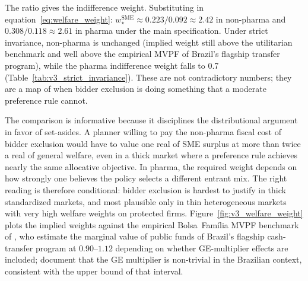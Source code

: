 The ratio gives the indifference weight. Substituting in equation~\eqref{eq:welfare_weight}: $w^{\text{SME}}_\star \approx 0.223/0.092 \approx 2.42$ in non-pharma and $0.308/0.118 \approx 2.61$ in pharma under the main specification. Under strict invariance, non-pharma is unchanged (implied weight still above the utilitarian benchmark and well above the empirical MVPF of Brazil's flagship transfer program), while the pharma indifference weight falls to 0.7 (Table~\ref{tab:v3_strict_invariance}). These are not contradictory numbers; they are a map of when bidder exclusion is doing something that a moderate preference rule cannot.

The comparison is informative because it disciplines the distributional argument in favor of set-asides. A planner willing to pay the non-pharma fiscal cost of bidder exclusion would have to value one real of SME surplus at more than twice a real of general welfare, even in a thick market where a preference rule achieves nearly the same allocative objective. In pharma, the required weight depends on how strongly one believes the policy selects a different entrant mix. The right reading is therefore conditional: bidder exclusion is hardest to justify in thick standardized markets, and most plausible only in thin heterogeneous markets with very high welfare weights on protected firms. Figure~\ref{fig:v3_welfare_weight} plots the implied weights against the empirical Bolsa~Fam\'ilia MVPF benchmark of \citet{bergstrom2025}, who estimate the marginal value of public funds of Brazil's flagship cash-transfer program at $0.90$--$1.12$ depending on whether GE-multiplier effects are included; \citet{mendes2023} document that the GE multiplier is non-trivial in the Brazilian context, consistent with the upper bound of that interval.


